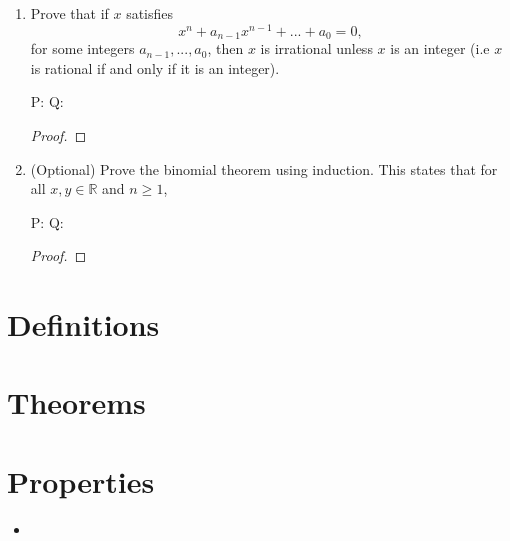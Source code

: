 \documentclass{article} %
\theoremstyle{plain}
\theoremstyle{definition}
\theoremstyle{case}
\begin{document}
\begin{enumerate}[label={\fbox{\textbf{Exercise \#\arabic* :}}}]
P: 
Q:

\begin{proof}
\end{proof} 

\newpage
\item Prove that if $x$ satisfies 
  \[ x^n+a_{n-1}x^{n-1}+...+a_{0}=0, \]
  for some integers $a_{n-1},...,a_0$, then $x$ is irrational unless $x$ is an integer (i.e $x$ is rational if and only if it is an integer).

P: 
Q:

\begin{proof}
\end{proof} 

\newpage
\item (Optional) Prove the binomial theorem using induction. This states that for all $x,y \in \mathbb{R}$ and $n\geq 1$,


P: 
Q:

\begin{proof}
\end{proof} 

\newpage
\end{enumerate}

\newpage

\section*{Definitions}

\section*{Theorems}

\section*{Properties}
  \begin{itemize}
        \item
  \end{itemize}
\end{document}
